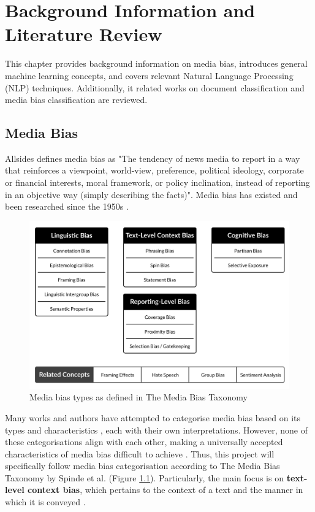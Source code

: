 \chapter{Background Information and Literature Review}
\label{cha:2}

This chapter provides background information on media bias, introduces general machine learning concepts, and covers relevant Natural Language Processing (NLP) techniques. Additionally, it related works on document classification and media bias classification are reviewed.


\section{Media Bias}

Allsides \cite{allsides-2022-bias-definition} defines media bias as "The tendency of news media to report in a way that reinforces a viewpoint, world-view, preference, political ideology, corporate or financial interests, moral framework, or policy inclination, instead of reporting in an objective way (simply describing the facts)". Media bias has existed and been researched since the 1950s \cite{white-1950-case-study-selection-news}.

\begin{figure}[htbp]
    \centering
    \includegraphics[width=0.9\linewidth]{images/bias-types-taxonomy.png}
    \caption{Media bias types as defined in The Media Bias Taxonomy \cite{spinde-2024-taxonomy}}
    \label{fig:media-bias-taxonomy}
\end{figure}

Many works and authors have attempted to categorise media bias based on its types and characteristics \cite{rodrigo-2024-systematic-review-media-bias,eberl-2017-bias-political,spinde-2024-taxonomy,allsides-media-bias-types}, each with their own interpretations. However, none of these categorisations align with each other, making a universally accepted characteristics of media bias difficult to achieve \cite{rodrigo-2024-systematic-review-media-bias}. Thus, this project will specifically follow media bias categorisation according to The Media Bias Taxonomy by Spinde et al. (Figure \ref{fig:media-bias-taxonomy}). Particularly, the main focus is on \textbf{text-level context bias}, which pertains to the context of a text and the manner in which it is conveyed \cite{spinde-2024-taxonomy}.

